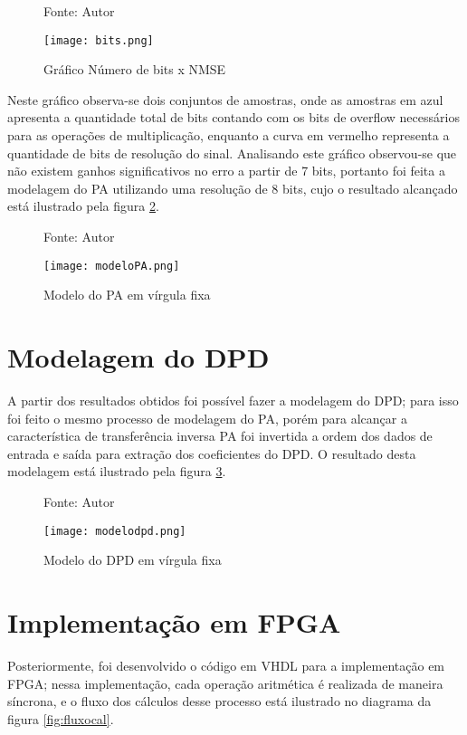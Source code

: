 \begin{figure}[htbp!]
    \centering
    \captionsetup{justification=centering}
    \caption*{Fonte: Autor}
    \texttt{[image: bits.png]}
    \caption{Gráfico Número de bits x NMSE}
    \label{fig:bits}
\end{figure}

Neste gráfico observa-se dois conjuntos de amostras, onde as amostras em azul apresenta a quantidade total de bits contando com os bits de overflow necessários para as operações de multiplicação, enquanto a curva em vermelho representa a quantidade de bits de resolução do sinal. Analisando este gráfico observou-se que não existem ganhos significativos no erro a partir de 7 bits, portanto foi feita a modelagem do PA utilizando uma resolução de 8 bits, cujo o resultado alcançado está ilustrado pela figura \ref{fig:modelopa}.

\begin{figure}[htbp!]
    \centering
    \captionsetup{justification=centering}
    \caption*{Fonte: Autor}
    \texttt{[image: modeloPA.png]}
    \caption{Modelo do PA em vírgula fixa}
    \label{fig:modelopa}
\end{figure}

\section{Modelagem do DPD}
A partir dos resultados obtidos foi possível fazer a modelagem do DPD; para isso foi feito o mesmo processo de modelagem do PA, porém para alcançar a característica de transferência inversa PA foi invertida a ordem dos dados de entrada e saída para extração dos coeficientes do DPD. O resultado desta modelagem está ilustrado pela figura \ref{fig:modelodpd}.

\begin{figure}[htbp!]
    \centering
    \captionsetup{justification=centering}
    \caption*{Fonte: Autor}
    \texttt{[image: modelodpd.png]}
    \caption{Modelo do DPD em vírgula fixa}
    \label{fig:modelodpd}
\end{figure}

\section{Implementação em FPGA}
Posteriormente, foi desenvolvido o código em VHDL para a implementação em FPGA; nessa implementação, cada operação aritmética é realizada de maneira síncrona, e o fluxo dos cálculos desse processo está ilustrado no diagrama da figura \ref{fig:fluxocal}.

